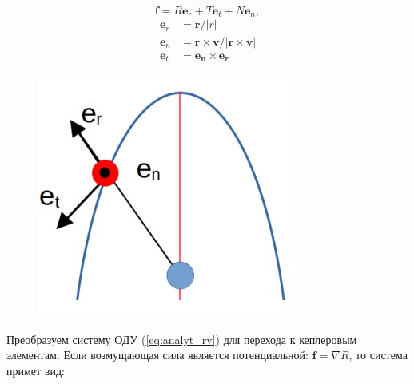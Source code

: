 \begin{equation*}
    \mathbf{f} = R \mathbf{e}_r + T \mathbf{e}_t + N \mathbf{e}_n,
\end{equation*}
\begin{align*}
    \mathbf{e}_r &= \mathbf{r} / |r| \\
    \mathbf{e}_n &= \mathbf{r} \times \mathbf{v} / |\mathbf{r} \times \mathbf{v}| \\
    \mathbf{e}_t &= \mathbf{e_n} \times \mathbf{e_r}
\end{align*}

\begin{figure}[h!]
    \centering
    \includegraphics[width=0.4\linewidth]{../images/review/orbital_system.jpg}
    \label{fig:orbital_system}
\end{figure}

Преобразуем систему ОДУ (\ref{eq:analyt_rv}) для перехода к кеплеровым элементам.
Если возмущающая сила является потенциальной: $\mathbf{f} = \nabla R$, то система примет вид:

